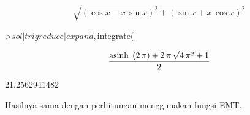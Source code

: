 \documentclass[a4paper,10pt]{article}
\begin{document}
\begin{eulernotebook}
\begin{eulercomment}
\begin{eulercomment}
\begin{eulercomment}
\begin{eulercomment}
\begin{eulercomment}
\begin{eulercomment}
\begin{eulercomment}
\begin{eulercomment}
\begin{eulercomment}
\begin{eulercomment}
\begin{eulercomment}
\begin{eulercomment}
\begin{eulercomment}
\begin{eulercomment}
\begin{eulercomment}
\begin{eulercomment}
\begin{eulercomment}
\begin{eulercomment}
\begin{eulercomment}
\begin{eulercomment}
\begin{eulercomment}
\begin{eulercomment}
\begin{eulercomment}
\begin{eulercomment}
\begin{eulercomment}
\begin{eulercomment}
\begin{eulercomment}
\begin{eulercomment}
\begin{euleroutput}
\end{euleroutput}
\begin{eulerformula}
\[
\sqrt{\left(\cos x-x\,\sin x\right)^2+\left(\sin x+x\,\cos x\right)  ^2}
\]
\end{eulerformula}
\begin{eulerprompt}
>$sol | trigreduce | expand, $integrate(%
\end{eulerprompt}
\begin{eulerformula}
\[
\frac{{\rm asinh}\; \left(2\,\pi\right)+2\,\pi\,\sqrt{4\,\pi^2+1}}{  2}
\]
\end{eulerformula}
\begin{euleroutput}
  21.2562941482
\end{euleroutput}
\begin{eulercomment}
Hasilnya sama dengan perhitungan menggunakan fungsi EMT.


\end{eulercomment}
\end{eulercomment}
\end{eulercomment}
\end{eulercomment}
\end{eulercomment}
\end{eulercomment}
\end{eulercomment}
\end{eulercomment}
\end{eulercomment}
\end{eulercomment}
\end{eulercomment}
\end{eulercomment}
\end{eulercomment}
\end{eulercomment}
\end{eulercomment}
\end{eulercomment}
\end{eulercomment}
\end{eulercomment}
\end{eulercomment}
\end{eulercomment}
\end{eulercomment}
\end{eulercomment}
\end{eulercomment}
\end{eulercomment}
\end{eulercomment}
\end{eulercomment}
\end{eulercomment}
\end{eulercomment}
\end{eulercomment}
\end{eulernotebook}
\end{document}
